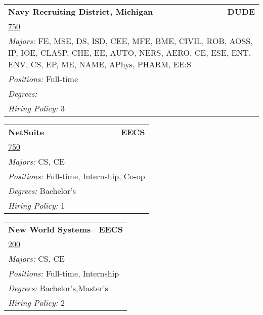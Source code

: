 \documentclass[twoside]{article}
\begin{document}
\begin{center}
\begin{multicols}{3}
\begin{FlushLeft}
\begin{minipage}{\columnwidth}
\end{minipage}
 
\begin{minipage}{\columnwidth}\begin{tabularx}{.95\columnwidth}{Xr}
                 {\Large\bf Navy Recruiting District, Michigan} & {\Large\bf DUDE}\\
    \multicolumn{2}{p{.95\columnwidth}}{\url{750}}\\
    \multicolumn{2}{p{.95\columnwidth}}{\emph{Majors:} FE, MSE, DS, ISD, CEE, MFE, BME, CIVIL, ROB, AOSS, IP, IOE, CLASP, CHE, EE, AUTO, NERS, AERO, CE, ESE, ENT, ENV, CS, EP, ME, NAME, APhys, PHARM, EE:S}\\
    \multicolumn{2}{p{.95\columnwidth}}{\emph{Positions:} Full-time}\\
    \multicolumn{2}{p{.95\columnwidth}}{\emph{Degrees:} }\\
    \multicolumn{2}{p{.95\columnwidth}}{\emph{Hiring Policy:} 3}\\
    \end{tabularx}
    
\end{minipage}
 
\begin{minipage}{\columnwidth}\begin{tabularx}{.95\columnwidth}{Xr}
                 {\Large\bf NetSuite} & {\Large\bf EECS}\\
    \multicolumn{2}{p{.95\columnwidth}}{\url{750}}\\
    \multicolumn{2}{p{.95\columnwidth}}{\emph{Majors:} CS, CE}\\
    \multicolumn{2}{p{.95\columnwidth}}{\emph{Positions:} Full-time, Internship, Co-op}\\
    \multicolumn{2}{p{.95\columnwidth}}{\emph{Degrees:} Bachelor's}\\
    \multicolumn{2}{p{.95\columnwidth}}{\emph{Hiring Policy:} 1}\\
    \end{tabularx}
    
\end{minipage}
 
\begin{minipage}{\columnwidth}\begin{tabularx}{.95\columnwidth}{Xr}
                 {\Large\bf New World Systems} & {\Large\bf EECS}\\
    \multicolumn{2}{p{.95\columnwidth}}{\url{200}}\\
    \multicolumn{2}{p{.95\columnwidth}}{\emph{Majors:} CS, CE}\\
    \multicolumn{2}{p{.95\columnwidth}}{\emph{Positions:} Full-time, Internship}\\
    \multicolumn{2}{p{.95\columnwidth}}{\emph{Degrees:} Bachelor's,Master's}\\
    \multicolumn{2}{p{.95\columnwidth}}{\emph{Hiring Policy:} 2}\\
    \end{tabularx}
    

\end{minipage}
\end{FlushLeft}
\end{multicols}
\end{center}
\end{document}
